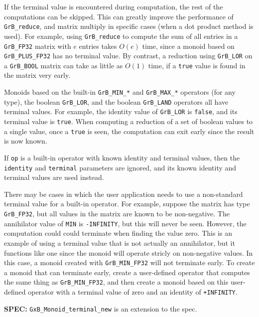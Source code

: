 \documentclass[12pt]{article}
\begin{document}
If the terminal value is encountered during computation, the rest of the
computations can be skipped.  This can greatly improve the performance of
\verb'GrB_reduce', and matrix multiply in specific cases (when a dot product
method is used).  For example, using \verb'GrB_reduce' to compute the sum of
all entries in a \verb'GrB_FP32' matrix with $e$ entries takes $O(e)$ time,
since a monoid based on \verb'GrB_PLUS_FP32' has no terminal value.  By
contrast, a reduction using \verb'GrB_LOR' on a \verb'GrB_BOOL' matrix can take
as little as $O(1)$ time, if a \verb'true' value is found in the matrix very
early.

Monoids based on the built-in \verb'GrB_MIN_*' and \verb'GrB_MAX_*' operators
(for any type), the boolean \verb'GrB_LOR', and the boolean \verb'GrB_LAND'
operators all have terminal values.  For example, the identity value of
\verb'GrB_LOR' is \verb'false', and its terminal value is \verb'true'.  When
computing a reduction of a set of boolean values to a single value, once a
\verb'true' is seen, the computation can exit early since the result is now
known.

If \verb'op' is a built-in operator with known identity and terminal values,
then the \verb'identity' and \verb'terminal' parameters are ignored, and its
known identity and terminal values are used instead.

There may be cases in which the user application needs to use a non-standard
terminal value for a built-in operator.  For example, suppose the matrix has
type \verb'GrB_FP32', but all values in the matrix are known to be
non-negative.  The annihilator value of \verb'MIN' is \verb'-INFINITY', but
this will never be seen.  However, the computation could could terminate when
finding the value zero.  This is an example of using a terminal value that is
not actually an annihilator, but it functions like one since the monoid will
operate stricly on non-negative values.  In this case, a monoid created with
\verb'GrB_MIN_FP32' will not terminate early.  To create a monoid that can
terminate early, create a user-defined operator that computes the same thing as
\verb'GrB_MIN_FP32', and then create a monoid based on this user-defined
operator with a terminal value of zero and an identity of \verb'+INFINITY'.

\begin{spec}
{\bf SPEC:} \verb'GxB_Monoid_terminal_new' is an extension to the spec.
\end{spec}

\end{document}
